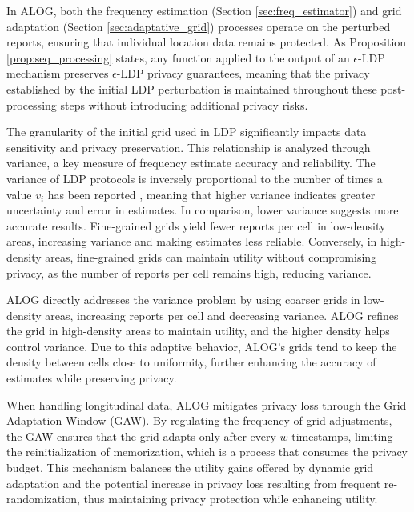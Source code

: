 In ALOG, both the frequency estimation (Section \ref{sec:freq_estimator}) and grid adaptation (Section \ref{sec:adaptative_grid}) processes operate on the perturbed reports, ensuring that individual location data remains protected. As Proposition \ref{prop:seq_processing} states, any function applied to the output of an $\epsilon$-LDP mechanism preserves $\epsilon$-LDP privacy guarantees, meaning that the privacy established by the initial LDP perturbation is maintained throughout these post-processing steps without introducing additional privacy risks.

The granularity of the initial grid used in LDP significantly impacts data sensitivity and privacy preservation. This relationship is analyzed through variance, a key measure of frequency estimate accuracy and reliability. The variance of LDP protocols is inversely proportional to the number of times a value \(v_i\) has been reported \cite{arcolezi2022frequency}, meaning that higher variance indicates greater uncertainty and error in estimates. In comparison, lower variance suggests more accurate results. Fine-grained grids yield fewer reports per cell in low-density areas, increasing variance and making estimates less reliable. Conversely, in high-density areas, fine-grained grids can maintain utility without compromising privacy, as the number of reports per cell remains high, reducing variance.

ALOG directly addresses the variance problem by using coarser grids in low-density areas, increasing reports per cell and decreasing variance. ALOG refines the grid in high-density areas to maintain utility, and the higher density helps control variance. Due to this adaptive behavior, ALOG's grids tend to keep the density between cells close to uniformity, further enhancing the accuracy of estimates while preserving privacy.

When handling longitudinal data, ALOG mitigates privacy loss through the Grid Adaptation Window (GAW). By regulating the frequency of grid adjustments, the GAW ensures that the grid adapts only after every \(w\) timestamps, limiting the reinitialization of memorization, which is a process that consumes the privacy budget. This mechanism balances the utility gains offered by dynamic grid adaptation and the potential increase in privacy loss resulting from frequent re-randomization, thus maintaining privacy protection while enhancing utility.